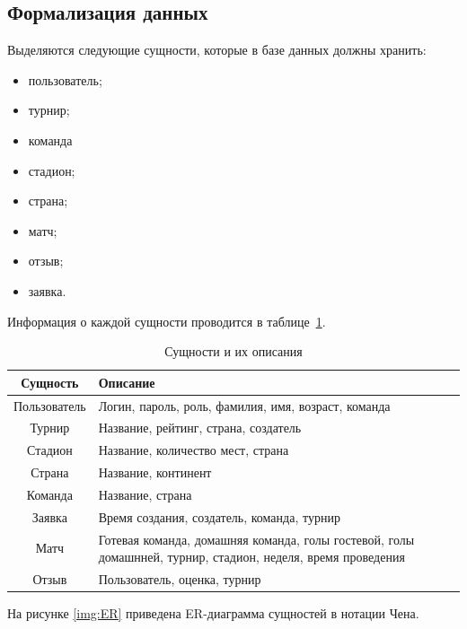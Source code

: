 \subsection{Формализация данных}

Выделяются следующие сущности, которые в базе данных должны хранить:
\begin{itemize}
	\item пользователь;
	\item турнир;
	\item команда
	\item стадион;
	\item страна;
	\item матч;
	\item отзыв;
	\item заявка.
\end{itemize}

Информация о каждой сущности проводится в таблице~\ref{tb:data}.

\begin{table}[ht]
	\begin{center}
		\begin{threeparttable}
			\caption{\label{tb:data} Сущности и их описания}
			\begin{tabular}{|c|p{10cm}|}
				\hline
				\textbf{Сущность} & \textbf{Описание} \\ \hline
				Пользователь & Логин, пароль, роль, фамилия, имя, возраст, команда \\ \hline
				Турнир & Название, рейтинг, страна, создатель \\ \hline
				Стадион & Название, количество мест, страна \\ \hline
				Страна & Название, континент \\ \hline
				Команда & Название, страна \\ \hline
				Заявка & Время создания, создатель, команда, турнир \\ \hline
				Матч & Готевая команда, домашняя команда, голы гостевой, голы домашнней, турнир, стадион, неделя, время проведения \\ \hline
				Отзыв & Пользователь, оценка, турнир \\ \hline
			\end{tabular}
		\end{threeparttable}
	\end{center}
\end{table}

\newpage

На рисунке \ref{img:ER} приведена ER-диаграмма сущностей в нотации Чена.

